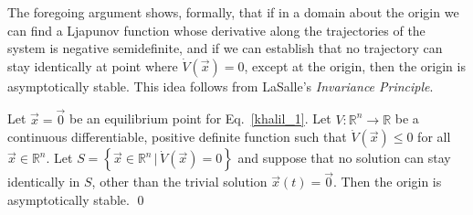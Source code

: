 \documentclass[12pt,a4paper,oneside]{book}
\begin{document}
\begin{onehalfspace}
The foregoing argument shows, formally, that if in a domain about the origin we 
can find a Ljapunov function whose derivative along the trajectories of the 
system is negative semidefinite, and if we can establish that no trajectory can 
stay identically at point where $\dot{V}(\vec{x})=0$, except at the origin, 
then the origin is asymptotically stable. This idea follows from LaSalle's 
\textit{Invariance Principle}.
\begin{thm}
	Let $\vec{x}=\vec{0}$ be an equilibrium point for Eq.~\eqref{khalil_1}. Let 
	$V:\mathbb{R}^n\rightarrow\mathbb{R}$ be a continuous differentiable, 
	positive definite function such that $\dot{V}(\vec{x})\le0$ for all 
	$\vec{x}\in\mathbb{R}^n$. Let $S=\left\lbrace 
	\vec{x}\in\mathbb{R}^n\,|\,\dot{V}(\vec{x})=0\right\rbrace$ and suppose 
	that no solution can stay identically in $S$, other than the trivial 
	solution $\vec{x}(t)=\vec{0}$. Then the origin is asymptotically stable.
	\qed
\end{thm}


\end{onehalfspace}
\end{document}
